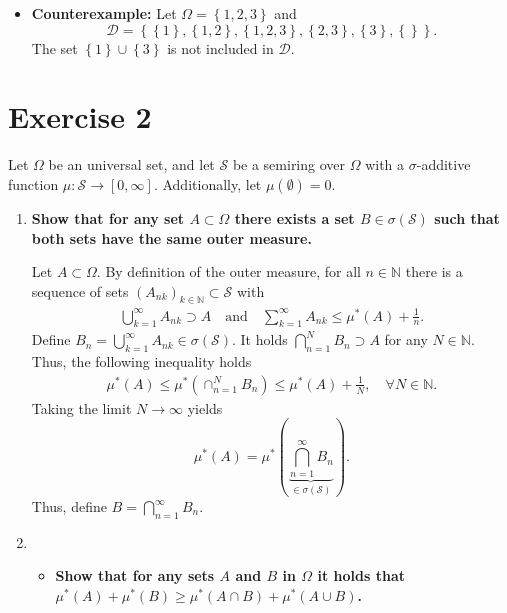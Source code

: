 \documentclass{article}
\begin{document}
\begin{itemize}
    \item \textbf{Counterexample:} Let $\Omega = \left\{1,2,3\right\}$ and $$\mathcal{D} = \left\{ \left\{ 1\right\}, \left\{ 1,2\right\}, \left\{ 1,2,3 \right\}, \left\{ 2, 3 \right\}, \left\{ 3 \right\}, \left\{ \right\} \right\}.$$
    The set $\left\{ 1 \right\} \cup \left\{ 3 \right\}$ is not included in $\mathcal{D}$.
\end{itemize}


\section*{Exercise 2}
Let $\Omega$ be an universal set, and let $\mathcal S$ be a semiring over $\Omega$ with a $\sigma$-additive function $\mu: \mathcal S \to [0, \infty]$. Additionally, let $\mu(\emptyset) = 0$.
\begin{enumerate}[label=(\roman*)]
    \item \textbf{Show that for any set $A \subset \Omega$ there exists a set $B \in \sigma(\mathcal{S})$ such that both sets have the same outer measure.}
    

    Let $A \subset \Omega$. By definition of the outer measure, for all $n \in \mathbb{N}$ there is a sequence of sets $(A_{nk})_{k \in \mathbb{N}} \subset \mathcal{S}$ with 
    \begin{align*}
        \bigcup_{k=1}^{\infty} A_{nk} \supset A \quad \text{and} \quad \sum^\infty_{k=1} A_{nk} \leq \mu^*(A) + \frac{1}{n}.
    \end{align*}
    Define $B_n = \bigcup_{k=1}^\infty A_{nk} \in \sigma(\mathcal S)$. It holds $\bigcap_{n = 1}^N B_n \supset A$ for any $N \in \mathbb{N}$. Thus, the following inequality holds 
    \begin{align*}
        \mu^*(A) \leq \mu^*(\cap^N_{n=1} B_n) \leq \mu^*(A) + \frac{1}{N}, \quad \forall N \in \mathbb{N}.
    \end{align*}
    Taking the limit $N \to \infty$ yields $$\mu^*(A) = \mu^*(\underbrace{\bigcap_{n=1}^\infty B_n}_{\in \sigma(\mathcal{S})}).$$ Thus, define $B = \bigcap_{n=1}^\infty B_n$.



    \item \begin{itemize}
        \item \textbf{Show that for any sets $A$ and $B$ in $\Omega$ it holds that $\mu^*(A) + \mu^*(B) \geq \mu^*(A \cap B) + \mu^*(A \cup B)$.}
    

\end{itemize}
\end{enumerate}
\end{document}
